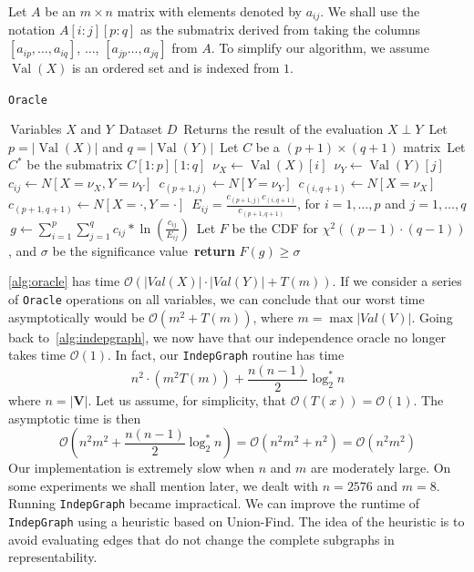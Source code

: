 \documentclass{amsart}
\DeclareMathOperator*{\Val}{\text{Val}}
\theoremstyle{plain}
\numberwithin{equation}{section}
\newcommand{\set}[1]{\mathbf{#1}}
\newcommand{\bigo}{\mathcal{O}}
\newcommand{\code}[1]{\lstinline[mathescape=true]{#1}}
\begin{document}
Let $A$ be an $m\times n$ matrix with elements denoted by $a_{ij}$. We shall use the notation
$A[i:j][p:q]$ as the submatrix derived from taking the columns $[a_{ip},\dots,a_{iq}]$, $\ldots$,
$[a_{jp}\ldots,a_{jq}]$ from $A$. To simplify our algorithm, we assume $\Val(X)$ is an ordered set
and is indexed from $1$.
\begin{algorithm}[H]
  \caption{\code{Oracle}}\label{alg:oracle}
  \begin{algorithmic}[1]
    \Require\,Variables $X$ and $Y$
    \Require\,Dataset $D$
    \Ensure\,Returns the result of the evaluation $X\perp Y$
    \State\,Let $p=|\Val(X)|$ and $q=|\Val(Y)|$
    \State\,Let $C$ be a $(p+1)\times(q+1)$ matrix
    \State\,Let $C^*$ be the submatrix $C[1:p][1:q]$
      \State\,$\nu_X\gets\Val(X)[i]$
        \State\,$\nu_Y\gets\Val(Y)[j]$
        \State\,$c_{ij} \gets N[X=\nu_X,Y=\nu_Y]$
        \State\,$c_{(p+1,j)}\gets N[Y=\nu_Y]$
      \EndFor%
      \State\,$c_{(i,q+1)}\gets N[X=\nu_X]$
    \EndFor%
    \State\,$c_{(p+1,q+1)}\gets N[X=\cdot,Y=\cdot]$
    \State\,$E_{ij} = \frac{c_{(p+1,j)}c_{(i,q+1)}}{c_{(p+1,q+1)}}$, for $i=1,\ldots,p$ and
      $j=1,\ldots,q$
    \State\,$g\gets\sum_{i=1}^p\sum_{j=1}^q c_{ij}*\ln\left(\frac{c_{ij}}{E_{ij}}\right)$
    \State\,Let $F$ be the CDF for $\chi^2((p-1)\cdot(q-1))$, and $\sigma$ be the significance
      value \State\,\textbf{return} $F(g) \geq \sigma$
  \end{algorithmic}
\end{algorithm}

\autoref{alg:oracle} has time $\bigo(|Val(X)|\cdot|Val(Y)| + T(m))$. If we consider a series of
\code{Oracle} operations on all variables, we can conclude that our worst time asymptotically would
be $\bigo(m^2+T(m))$, where $m=\max |Val(V)|$. Going back to~\autoref{alg:indepgraph}, we now have
that our independence oracle no longer takes time $\bigo(1)$. In fact, our \code{IndepGraph}
routine has time
\begin{equation*}
  n^2\cdot(m^2 T(m))+\frac{n(n-1)}{2}\log_2^*n
\end{equation*}
where $n=|\set{V}|$. Let us assume, for simplicity, that $\bigo(T(x))=\bigo(1)$. The asymptotic
time is then
\begin{equation*}
  \bigo\left(n^2m^2 + \frac{n(n-1)}{2}\log_2^*n\right) = \bigo(n^2m^2 + n^2) = \bigo(n^2m^2)
\end{equation*}
Our implementation is extremely slow when $n$ and $m$ are moderately large. On some experiments we
shall mention later, we dealt with $n=2576$ and $m=8$. Running \code{IndepGraph} became
impractical. We can improve the runtime of \code{IndepGraph} using a heuristic based on Union-Find.
The idea of the heuristic is to avoid evaluating edges that do not change the complete subgraphs in
representability.
\end{document}
